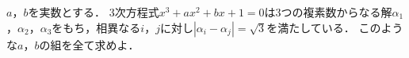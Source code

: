 $a$，$b$を実数とする．
3次方程式$x^3+ax^2+bx+1=0$は3つの複素数からなる解$\alpha_1$，$\alpha_2$，$\alpha_3$をもち，相異なる$i$，$j$に対し$|\alpha_i-\alpha_j|=\sqrt{3}$を満たしている．
このような$a$，$b$の組を全て求めよ．
